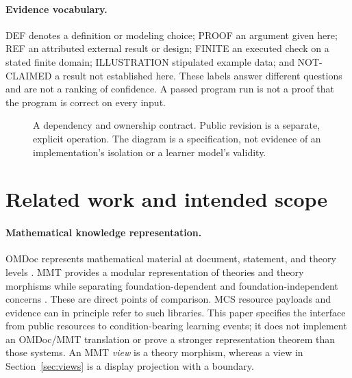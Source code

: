 \documentclass[11pt,a4paper]{article}
\theoremstyle{remark}
\newcommand{\status}[1]{\textsf{\small #1}}
\begin{document}
\paragraph{Evidence vocabulary.}
\status{DEF} denotes a definition or modeling choice; \status{PROOF} an argument
given here; \status{REF} an attributed external result or design;
\status{FINITE} an executed check on a stated finite domain;
\status{ILLUSTRATION} stipulated example data; and \status{NOT-CLAIMED} a result
not established here. These labels answer different questions and are not a
ranking of confidence. A passed program run is not a proof that the program is
correct on every input.

\begin{figure}[t]
\centering
{}
\caption{A dependency and ownership contract. Public revision is a separate,
explicit operation. The diagram is a specification, not evidence of an
implementation's isolation or a learner model's validity.}
\label{fig:layers}
\end{figure}

\section{Related work and intended scope}\label{sec:related}
\paragraph{Mathematical knowledge representation.}
OMDoc represents mathematical material at document, statement, and theory
levels \citep{omdoc}. MMT provides a modular representation of theories and
theory morphisms while separating foundation-dependent and
foundation-independent concerns \citep{mmt}. These are direct points of
comparison. MCS resource payloads and evidence can in principle refer to such
libraries. This paper specifies the interface from public resources to
condition-bearing learning events; it does not implement an OMDoc/MMT
translation or prove a stronger representation theorem than those systems.
An MMT \emph{view} is a theory morphism, whereas a view in
Section~\ref{sec:views} is a display projection with a boundary.
\end{document}
